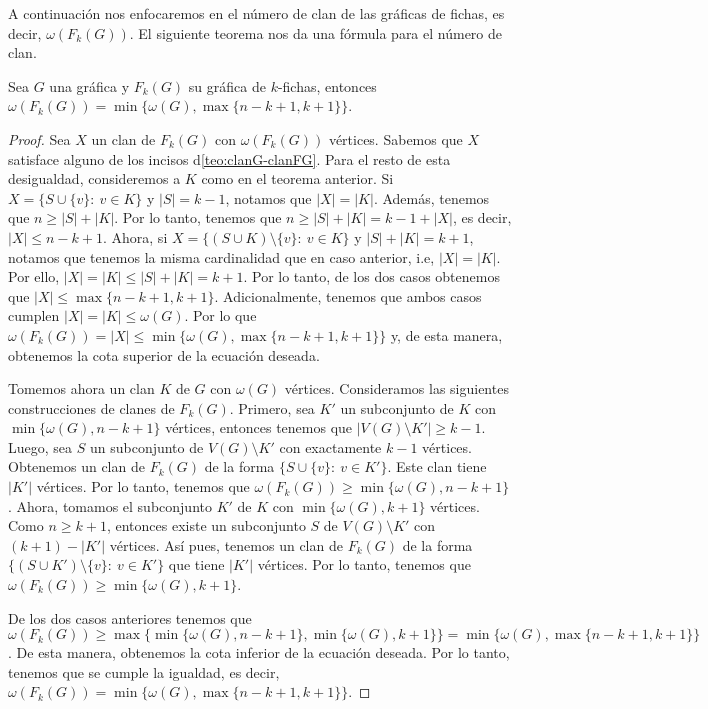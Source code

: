 A continuaci\'on nos enfocaremos en el n\'umero de clan de las gr\'aficas de
fichas, es decir, $\omega(F_k(G))$. El siguiente teorema nos da una f\'ormula
para el n\'umero de clan.
            
\begin{teorema}
\label{teo:clan-max}
    Sea $G$ una gr\'afica y $F_k(G)$ su gr\'afica de $k$-fichas, entonces
    $\omega(F_k(G))= \min \{\omega(G), \max \{n-k+1,k+1\}\}$.
\end{teorema}

\begin{proof}
    Sea $X$ un clan de $F_k(G)$ con $\omega(F_k(G))$ v\'ertices. Sabemos que $X$
    satisface alguno de los incisos d\cref{teo:clanG-clanFG}. Para el resto de
    esta desigualdad, consideremos a $K$ como en el teorema anterior.   Si $X =
    \{S \cup \{v\} \colon\ v \in K\}$ y $|S| = k-1$, notamos que $|X| = |K|$.
    Adem\'as, tenemos que $n \geq |S| + |K|$. Por lo tanto, tenemos que $n \geq
    |S| + |K| = k-1 + |X|$, es decir, $|X| \leq n-k+1$. Ahora, si $X = \{(S\cup
    K) \setminus \{v\} \colon\ v \in K \}$ y $|S| + |K| = k+1$, notamos que
    tenemos la misma cardinalidad que en caso anterior, i.e, $|X| =|K|$.
    Por ello, $|X| = |K| \leq |S| + |K| = k+1$. Por lo tanto, de los dos casos
    obtenemos que $|X| \leq \max\{n-k+1, k+1\}$. Adicionalmente, tenemos que
    ambos casos cumplen $|X| = |K| \leq \omega(G)$. Por lo que $\omega(F_k(G)) =
    |X| \leq \min \{\omega(G), \max \{n-k+1, k+1\}\}$ y, de esta manera, obtenemos
    la cota superior de la ecuaci\'on deseada.

    Tomemos ahora un clan $K$ de $G$ con $\omega(G)$ v\'ertices. Consideramos
    las siguientes construcciones de clanes de $F_k(G)$. Primero, sea $K'$ un
    subconjunto de $K$ con $\min\{\omega(G),n-k+1\}$ v\'ertices, entonces
    tenemos que $|V(G) \setminus K'| \geq k-1$. Luego, sea $S$ un subconjunto de
    $V(G) \setminus K'$ con exactamente $k-1$ v\'ertices. Obtenemos un clan de
    $F_k(G)$ de la forma $\{ S \cup \{v\} \colon\ v \in K'\}$. Este clan tiene
    $|K'|$ v\'ertices. Por lo tanto, tenemos que $\omega(F_k(G)) \geq \min
    \{\omega(G), n-k+1\}$. Ahora, tomamos el subconjunto $K'$ de $K$ con $\min
    \{ \omega(G), k+1\}$ v\'ertices. Como $n \geq k+1$, entonces existe un
    subconjunto $S$ de $V(G) \setminus K'$ con $(k+1)-|K'|$ v\'ertices. As\'i
    pues, tenemos un clan de $F_k(G)$ de la forma $\{ (S \cup K') \setminus \{v\}
    \colon\ v \in K'\}$ que tiene $|K'|$ v\'ertices. Por lo tanto, tenemos que
    $\omega(F_k(G)) \geq \min \{\omega(G), k+1\}$.

    De los dos casos anteriores tenemos que $\omega(F_k(G)) \geq \max \{\min
    \{\omega(G), n-k+1\}, \min \{\omega(G), k+1 \}\} = \min \{\omega(G), \max
    \{n-k+1,k+1\}\}$. De esta manera, obtenemos la cota inferior de la ecuaci\'on
    deseada. Por lo tanto, tenemos que se cumple la igualdad, es decir,
    $\omega(F_k(G))= \min \{\omega(G), \max \{n-k+1,k+1\}\}$.
\end{proof}

